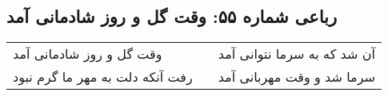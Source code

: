 \begin{center}
\section*{رباعی شماره ۵۵: وقت گل و روز شادمانی آمد}
\label{sec:055}
\begin{longtable}{l p{0.5cm} r}
وقت گل و روز شادمانی آمد
&&
آن شد که به سرما نتوانی آمد
\\
رفت آنکه دلت به مهر ما گرم نبود
&&
سرما شد و وقت مهربانی آمد
\\
\end{longtable}
\end{center}
